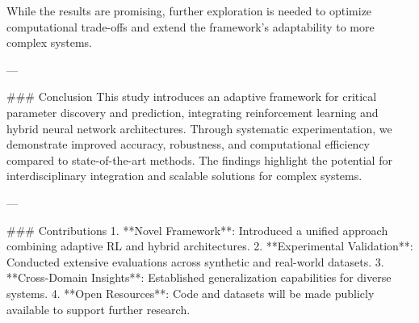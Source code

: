 While the results are promising, further exploration is needed to optimize computational trade-offs and extend the framework’s adaptability to more complex systems.

---

### Conclusion  
This study introduces an adaptive framework for critical parameter discovery and prediction, integrating reinforcement learning and hybrid neural network architectures. Through systematic experimentation, we demonstrate improved accuracy, robustness, and computational efficiency compared to state-of-the-art methods. The findings highlight the potential for interdisciplinary integration and scalable solutions for complex systems.  

---

### Contributions  
1. **Novel Framework**: Introduced a unified approach combining adaptive RL and hybrid architectures.  
2. **Experimental Validation**: Conducted extensive evaluations across synthetic and real-world datasets.  
3. **Cross-Domain Insights**: Established generalization capabilities for diverse systems.  
4. **Open Resources**: Code and datasets will be made publicly available to support further research.